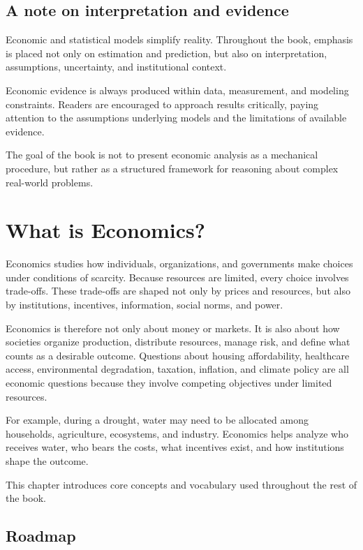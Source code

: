 \documentclass[
  11pt,
  oneside]{book}
\begin{document}
\section{A note on interpretation and evidence}\label{a-note-on-interpretation-and-evidence}

Economic and statistical models simplify reality. Throughout the book, emphasis is placed not only on estimation and prediction, but also on interpretation, assumptions, uncertainty, and institutional context.

Economic evidence is always produced within data, measurement, and modeling constraints. Readers are encouraged to approach results critically, paying attention to the assumptions underlying models and the limitations of available evidence.

The goal of the book is not to present economic analysis as a mechanical procedure, but rather as a structured framework for reasoning about complex real-world problems.

\chapter{What is Economics?}\label{what-is-econ}

Economics studies how individuals, organizations, and governments make choices under conditions of scarcity. Because resources are limited, every choice involves trade-offs. These trade-offs are shaped not only by prices and resources, but also by institutions, incentives, information, social norms, and power.

Economics is therefore not only about money or markets. It is also about how societies organize production, distribute resources, manage risk, and define what counts as a desirable outcome. Questions about housing affordability, healthcare access, environmental degradation, taxation, inflation, and climate policy are all economic questions because they involve competing objectives under limited resources.

For example, during a drought, water may need to be allocated among households, agriculture, ecosystems, and industry. Economics helps analyze who receives water, who bears the costs, what incentives exist, and how institutions shape the outcome.

This chapter introduces core concepts and vocabulary used throughout the rest of the book.

\section{Roadmap}\label{roadmap}
\end{document}
